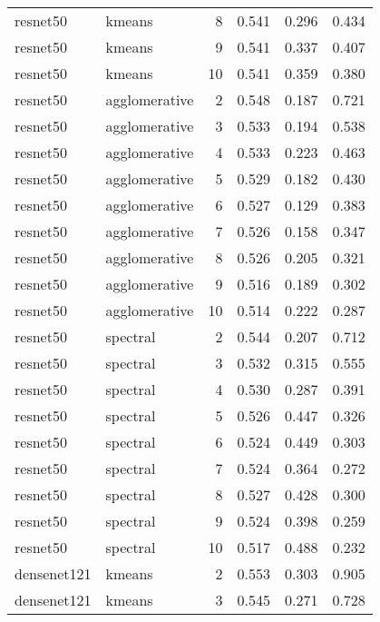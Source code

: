\begin{longtable}{llrrrr}
   resnet50 &        kmeans &  8 &            0.541 &   0.296 &    0.434 \\
   resnet50 &        kmeans &  9 &            0.541 &   0.337 &    0.407 \\
   resnet50 &        kmeans & 10 &            0.541 &   0.359 &    0.380 \\
   resnet50 & agglomerative &  2 &            0.548 &   0.187 &    0.721 \\
   resnet50 & agglomerative &  3 &            0.533 &   0.194 &    0.538 \\
   resnet50 & agglomerative &  4 &            0.533 &   0.223 &    0.463 \\
   resnet50 & agglomerative &  5 &            0.529 &   0.182 &    0.430 \\
   resnet50 & agglomerative &  6 &            0.527 &   0.129 &    0.383 \\
   resnet50 & agglomerative &  7 &            0.526 &   0.158 &    0.347 \\
   resnet50 & agglomerative &  8 &            0.526 &   0.205 &    0.321 \\
   resnet50 & agglomerative &  9 &            0.516 &   0.189 &    0.302 \\
   resnet50 & agglomerative & 10 &            0.514 &   0.222 &    0.287 \\
   resnet50 &      spectral &  2 &            0.544 &   0.207 &    0.712 \\
   resnet50 &      spectral &  3 &            0.532 &   0.315 &    0.555 \\
   resnet50 &      spectral &  4 &            0.530 &   0.287 &    0.391 \\
   resnet50 &      spectral &  5 &            0.526 &   0.447 &    0.326 \\
   resnet50 &      spectral &  6 &            0.524 &   0.449 &    0.303 \\
   resnet50 &      spectral &  7 &            0.524 &   0.364 &    0.272 \\
   resnet50 &      spectral &  8 &            0.527 &   0.428 &    0.300 \\
   resnet50 &      spectral &  9 &            0.524 &   0.398 &    0.259 \\
   resnet50 &      spectral & 10 &            0.517 &   0.488 &    0.232 \\
densenet121 &        kmeans &  2 &            0.553 &   0.303 &    0.905 \\
densenet121 &        kmeans &  3 &            0.545 &   0.271 &    0.728 \\

\end{longtable}
